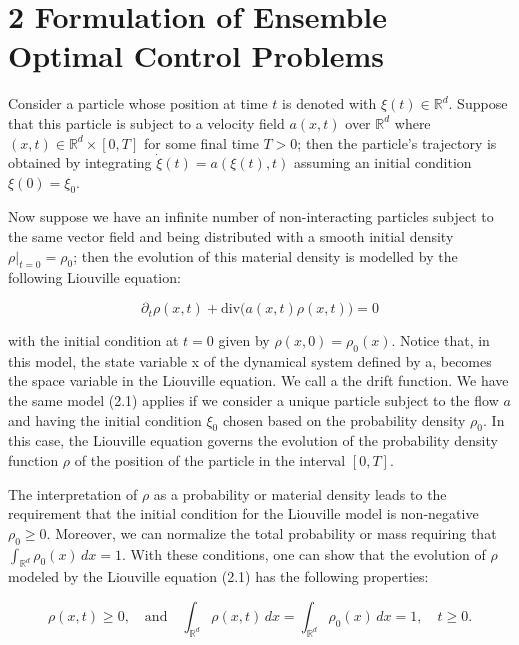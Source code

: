 \documentclass{article}
\begin{document}
\section*{2 Formulation of Ensemble Optimal Control Problems}

Consider a particle whose position at time $t$ is denoted with $\xi(t) \in \mathbb{R}^d$. Suppose that this particle is subject to a velocity field $a(x, t)$ over $\mathbb{R}^d$ where $(x, t) \in \mathbb{R}^d \times [0, T]$ for some final time $T > 0$; then the particle’s trajectory is obtained by integrating $\dot{\xi}(t) = a(\xi(t), t)$ assuming an initial condition $\xi(0) = \xi_0$.

Now suppose we have an infinite number of non-interacting particles subject to the same vector field and being distributed with a smooth initial density $\rho|_{t=0} = \rho_0$; then the evolution of this material density is modelled by the following Liouville equation:

\begin{equation}
    \partial_t \rho(x, t) + \text{div}\big( a(x, t) \rho(x, t) \big) = 0 \tag{2.1}\nonumber
\end{equation}

with the initial condition at $t = 0$ given by $\rho(x, 0) = \rho_0(x)$. Notice that, in this model,
the state variable x of the dynamical system defined by a, becomes the space variable
in the Liouville equation. We call a the drift function.
We have the same model (2.1) applies if we consider a unique particle subject to the flow $a$ and having the initial condition $\xi_0$ chosen based on the probability density $\rho_0$. In this case, the Liouville equation governs the evolution of the probability density function $\rho$ of the position of the particle in the interval $[0, T]$.

The interpretation of $\rho$ as a probability or material density leads to the requirement that the initial condition for the Liouville model is non-negative $\rho_0 \geq 0$. Moreover, we can normalize the total probability or mass requiring that $\int_{\mathbb{R}^d} \rho_0(x) \, dx = 1$. With these conditions, one can show that the evolution of $\rho$ modeled by the Liouville equation (2.1) has the following properties:

\begin{equation}
    \rho(x, t) \geq 0, \quad \text{and} \quad \int_{\mathbb{R}^d} \rho(x, t) \, dx = \int_{\mathbb{R}^d} \rho_0(x) \, dx = 1,  \quad t \geq 0. \tag{2.2}\nonumber
\end{equation}
\end{document}
